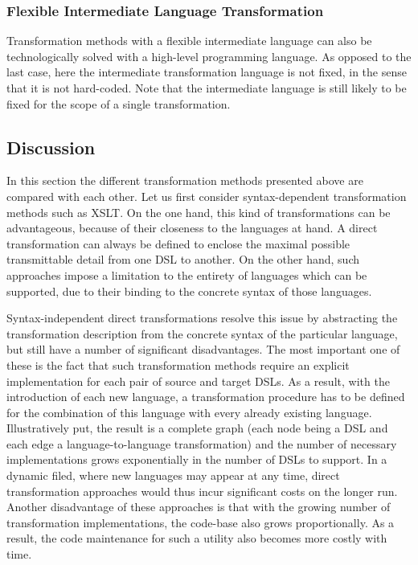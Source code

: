 \subsubsection{Flexible Intermediate Language Transformation}

Transformation methods with a flexible intermediate language can also be technologically solved with a high-level programming language. As opposed to the last case, here the intermediate transformation language is not fixed, in the sense that it is not hard-coded. Note that the intermediate language is still likely to be fixed for the scope of a single transformation.

\subsection{Discussion}

In this section the different transformation methods presented above are compared with each other. Let us first consider syntax-dependent transformation methods such as XSLT. On the one hand, this kind of transformations can be advantageous, because of their closeness to the languages at hand. A direct transformation can always be defined to enclose the maximal possible transmittable detail from one DSL to another. On the other hand, such approaches impose a limitation to the entirety of languages which can be supported, due to their binding to the concrete syntax of those languages.

Syntax-independent direct transformations resolve this issue by abstracting the transformation description from the concrete syntax of the particular language, but still have a number of significant disadvantages. The most important one of these is the fact that such transformation methods require an explicit implementation for each pair of source and target DSLs. As a result, with the introduction of each new language, a transformation procedure has to be defined for the combination of this language with every already existing language. Illustratively put, the result is a complete graph (each node being a DSL and each edge a language-to-language transformation) and the number of necessary implementations grows exponentially in the number of DSLs to support. In a dynamic filed, where new languages may appear at any time, direct transformation approaches would thus incur significant costs on the longer run. Another disadvantage of these approaches is that with the growing number of transformation implementations, the code-base also grows proportionally. As a result, the code maintenance for such a utility also becomes more costly with time. 

